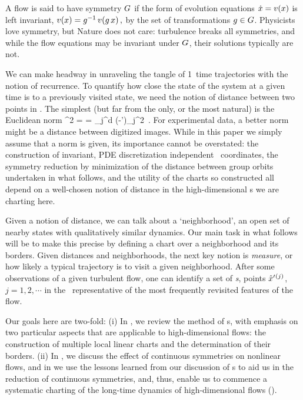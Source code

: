 \documentclass[aip,cha,reprint,
secnumarabic,
nofootinbib, tightenlines,
nobibnotes, showkeys, showpacs,
groupedaddress
]{revtex4-1}
\begin{document}
A flow is said to have symmetry $G$ if the form of evolution
equations $\dot{x} = v(x)$ is left invariant,
\(
v(x)=g^{-1} \, v(g \, x)
\,,
\) %
by the set of transformations $g \in {\ensuremath{G}}$. Physicists love
symmetry, but Nature does not care: turbulence breaks all
symmetries, and while the flow equations may be invariant under $G$,
their solutions typically are not.

We can make headway in unraveling the tangle
of 1\dmn\ time trajectories with the notion of recurrence. To quantify how
close the state of the system at a given time is to a previously
visited state, we need the notion of distance between two points in
\statesp. The simplest (but far from the only, or the most natural) is
the Euclidean norm
\beq
  ^2  =  =
\sum_j^d
(\ssp-\ssp')_j^2
\,.
For experimental data, a better norm might be a distance between digitized
images. While in this paper we simply assume that a norm is given, its
importance cannot be overstated: the construction of invariant, PDE
discretization independent \statesp\ coordinates, the symmetry
reduction by minimization of the distance between group orbits undertaken
in what follows, and the utility of the charts so constructed all depend on a
well-chosen notion of distance in the high-dimensional \statesp s we are
charting here.

Given a notion of distance, we can talk about a `neighborhood', an open
set of nearby states with qualitatively similar dynamics. Our main task
in what follows will be to make this precise by defining a chart over a
neighborhood and its borders. Given distances and neighborhoods, the next
key notion is  \emph{measure}, or how likely a typical trajectory is to
visit a given neighborhood. After some observations of a given turbulent
flow, one can identify a set of \emph{\template
s}, {points} ${\hat{x}'}{}^{(j)}$,
$j=1,2,\cdots$ in the \statesp\ representative of the most frequently
revisited features of the flow.

Our goals here are two-fold:
(i) In , we review the method of \PoincSec s, with
    emphasis on two particular aspects that are applicable to
    high-dimensional flows: the construction of multiple local linear
    charts and the determination of their borders.
(ii) In , we discuss the effect of continuous symmetries on
    nonlinear flows, and in  we use the lessons learned
    from our discussion of \PoincSec s to aid us in the reduction of
    continuous symmetries, and, thus, enable us to commence a systematic
    charting of the long-time dynamics of high-dimensional flows
    ().
\end{document}
